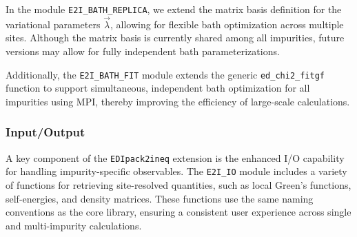\documentclass[edipack2.tex]{subfiles}
\begin{document}
In the module {\tt E2I\_BATH\_REPLICA}, we extend the 
matrix basis definition for the variational parameters 
$\vec{\lambda}$, allowing for flexible bath optimization across 
multiple sites. Although the matrix basis is currently shared among 
all impurities, future versions may allow for fully independent 
bath parameterizations.

Additionally, the {\tt E2I\_BATH\_FIT} module extends the generic 
{\tt ed\_chi2\_fitgf} function to support simultaneous, independent 
bath optimization for all impurities using MPI, thereby improving the 
efficiency of large-scale calculations.


 
\subsubsection{Input/Output}\label{ssSecIneqIO}
A key component of the {\tt EDIpack2ineq} extension is the 
enhanced I/O capability for handling impurity-specific observables. 
The {\tt E2I\_IO} module includes a variety of functions for 
retrieving site-resolved quantities, such as local Green's functions, 
self-energies, and density matrices. These functions use the same 
naming conventions as the core \NAME library, ensuring a consistent 
user experience across single and multi-impurity calculations.
\end{document}

